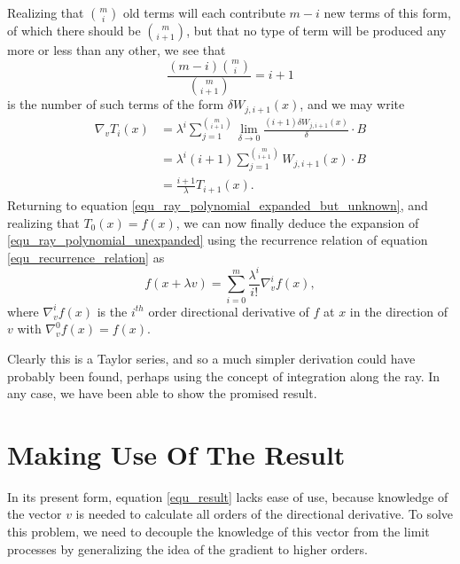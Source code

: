\documentclass{birkjour}
\theoremstyle{definition}
\theoremstyle{remark}
\numberwithin{equation}{section}
\begin{document}
Realizing that $\binom{m}{i}$ old terms will each contribute $m-i$ new terms of
this form, of which there should be $\binom{m}{i+1}$, but that no type of term
will be produced any more or less than any other, we see that
\begin{equation*}
\frac{(m-i)\binom{m}{i}}{\binom{m}{i+1}}=i+1
\end{equation*}
is the number of such terms of the form $\delta W_{j,i+1}(x)$, and we may write
\begin{align}
\nabla_v T_i(x) &= \lambda^i\sum_{j=1}^{\binom{m}{i+1}}\lim_{\delta\to 0}
\frac{(i+1)\delta W_{j,i+1}(x)}{\delta}\cdot B\nonumber \\
 &= \lambda^i(i+1)\sum_{j=1}^{\binom{m}{i+1}} W_{j,i+1}(x)\cdot B\nonumber \\
 &= \frac{i+1}{\lambda}T_{i+1}(x).\label{equ_recurrence_relation}
\end{align}
Returning to equation \eqref{equ_ray_polynomial_expanded_but_unknown},
and realizing that $T_0(x)=f(x)$, we can now finally deduce the expansion of
\eqref{equ_ray_polynomial_unexpanded} using the recurrence relation
of equation \eqref{equ_recurrence_relation} as
\begin{equation}\label{equ_result}
f(x+\lambda v) = \sum_{i=0}^m\frac{\lambda^i}{i!}\nabla_v^i f(x),
\end{equation}
where $\nabla_v^i f(x)$ is the $i^{th}$ order directional derivative of $f$ at $x$
in the direction of $v$ with $\nabla_v^0 f(x)=f(x)$.

Clearly this is a Taylor series, and so a much simpler
derivation could have probably been found, perhaps using the
concept of integration along the ray.  In any case, we have been
able to show the promised result.

\section{Making Use Of The Result}

In its present form, equation \eqref{equ_result} lacks ease of use, because knowledge of the
vector $v$ is needed to calculate all orders of the directional derivative.  To solve this problem,
we need to decouple the knowledge of this vector from the limit processes by generalizing the
idea of the gradient to higher orders.
\end{document}
